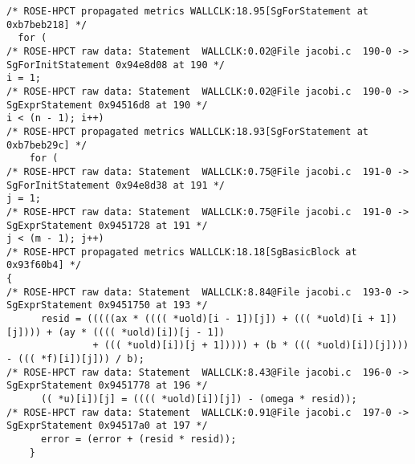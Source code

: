 {\scriptsize
\begin{verbatim}
/* ROSE-HPCT propagated metrics WALLCLK:18.95[SgForStatement at 0xb7beb218] */
  for (
/* ROSE-HPCT raw data: Statement  WALLCLK:0.02@File jacobi.c  190-0 -> SgForInitStatement 0x94e8d08 at 190 */
i = 1;
/* ROSE-HPCT raw data: Statement  WALLCLK:0.02@File jacobi.c  190-0 -> SgExprStatement 0x94516d8 at 190 */
i < (n - 1); i++)
/* ROSE-HPCT propagated metrics WALLCLK:18.93[SgForStatement at 0xb7beb29c] */
    for (
/* ROSE-HPCT raw data: Statement  WALLCLK:0.75@File jacobi.c  191-0 -> SgForInitStatement 0x94e8d38 at 191 */
j = 1;
/* ROSE-HPCT raw data: Statement  WALLCLK:0.75@File jacobi.c  191-0 -> SgExprStatement 0x9451728 at 191 */
j < (m - 1); j++)
/* ROSE-HPCT propagated metrics WALLCLK:18.18[SgBasicBlock at 0x93f60b4] */
{
/* ROSE-HPCT raw data: Statement  WALLCLK:8.84@File jacobi.c  193-0 -> SgExprStatement 0x9451750 at 193 */
      resid = (((((ax * (((( *uold)[i - 1])[j]) + ((( *uold)[i + 1])[j]))) + (ay * (((( *uold)[i])[j - 1]) 
               + ((( *uold)[i])[j + 1])))) + (b * ((( *uold)[i])[j]))) - ((( *f)[i])[j])) / b);
/* ROSE-HPCT raw data: Statement  WALLCLK:8.43@File jacobi.c  196-0 -> SgExprStatement 0x9451778 at 196 */
      (( *u)[i])[j] = (((( *uold)[i])[j]) - (omega * resid));
/* ROSE-HPCT raw data: Statement  WALLCLK:0.91@File jacobi.c  197-0 -> SgExprStatement 0x94517a0 at 197 */
      error = (error + (resid * resid));
    }
\end{verbatim}
}
